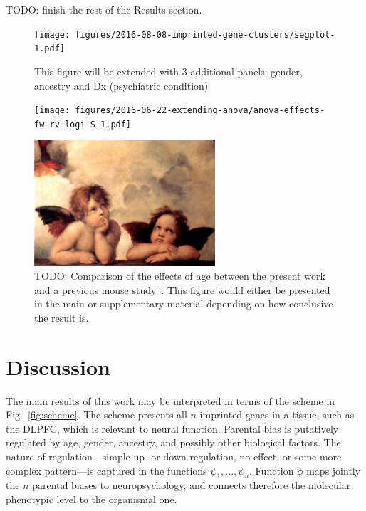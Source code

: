 \documentclass[letterpaper]{article}
\begin{document}
TODO: finish the rest of the Results section.

\begin{figure}
\begin{center}
\texttt{[image: figures/2016-08-08-imprinted-gene-clusters/segplot-1.pdf]}
\end{center}
\caption{This figure will be extended with 3 additional panels: gender,
ancestry and Dx (psychiatric condition)}
\label{fig:age-effect}
\end{figure}

\begin{figure}
\begin{center}
\texttt{[image: figures/2016-06-22-extending-anova/anova-effects-fw-rv-logi-S-1.pdf]}
\end{center}
\caption{}
\label{fig:anova}
\end{figure}

\begin{figure}
\begin{center}
\includegraphics[width=0.6\textwidth]{figures/raffaello-putti.jpg}
\end{center}
\caption{TODO: Comparison of the effects of age between the present work and a
previous mouse study~\cite{Perez2015}.  This figure would either be presented
in the main or supplementary material depending on how conclusive the result
is.}
\label{fig:mouse-comparison}
\end{figure}


\section{Discussion}

The main results of this work may be interpreted in terms of the scheme in
Fig.~\ref{fig:scheme}.  The scheme presents all \(n\) imprinted genes in a
tissue, such as the DLPFC, which is relevant to neural function.  Parental
bias is putatively regulated by age, gender, ancestry, and possibly other
biological factors.  The nature of regulation---simple up- or down-regulation,
no effect, or some more complex pattern---is captured in the functions
\(\psi_1,...,\psi_n\).  Function \(\phi\) maps jointly the \(n\) parental
biases to neuropsychology, and connects therefore the molecular phenotypic
level to the organismal one.
\end{document}
